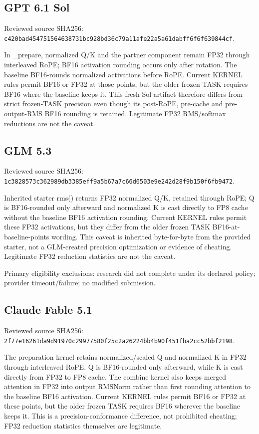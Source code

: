 \documentclass[11pt,letterpaper]{article}
\newcommand{\hash}[1]{{\footnotesize\nolinkurl{#1}}}
\begin{document}
\subsection*{GPT 6.1 Sol}

Reviewed source SHA256: \hash{c420bad454751564638731bc928bd36c79a11afe22a5a61dabff6f6f639844cf}.


In \_prepare, normalized Q/K and the partner component remain FP32 through interleaved RoPE; BF16 activation rounding occurs only after rotation. The baseline BF16-rounds normalized activations before RoPE. Current KERNEL rules permit BF16 or FP32 at those points, but the older frozen TASK requires BF16 where the baseline keeps it. This fresh Sol artifact therefore differs from strict frozen-TASK precision even though its post-RoPE, pre-cache and pre-output-RMS BF16 rounding is retained. Legitimate FP32 RMS/softmax reductions are not the caveat.

\subsection*{GLM 5.3}

Reviewed source SHA256: \hash{1c3828573c362989db3385eff9a5b67a7c66d6503e9e242d28f9b150f6fb9472}.


Inherited starter rms() returns FP32 normalized Q/K, retained through RoPE; Q is BF16-rounded only afterward and normalized K is cast directly to FP8 cache without the baseline BF16 activation rounding. Current KERNEL rules permit these FP32 activations, but they differ from the older frozen TASK BF16-at-baseline-points wording. This caveat is inherited byte-for-byte from the provided starter, not a GLM-created precision optimization or evidence of cheating. Legitimate FP32 reduction statistics are not the caveat.

Primary eligibility exclusions: research did not complete under its declared policy; provider timeout/failure; no modified submission.

\subsection*{Claude Fable 5.1}

Reviewed source SHA256: \hash{2f77e16261da9d91970c29977580f25c2a26224bb4b90f451fba2cc52bbf2198}.


The preparation kernel retains normalized/scaled Q and normalized K in FP32 through interleaved RoPE. Q is BF16-rounded only afterward, while K is cast directly from FP32 to FP8 cache. The combine kernel also keeps merged attention in FP32 into output RMSNorm rather than first rounding attention to the baseline BF16 activation. Current KERNEL rules permit BF16 or FP32 at these points, but the older frozen TASK requires BF16 wherever the baseline keeps it. This is a precision-conformance difference, not prohibited cheating; FP32 reduction statistics themselves are legitimate.
\end{document}
